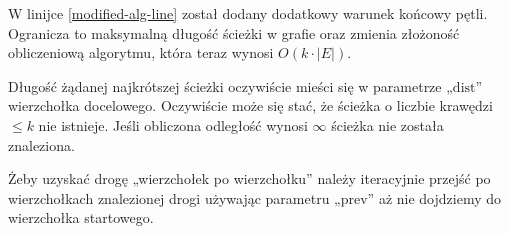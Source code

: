 \documentclass[14pt]{article}
\begin{document}
W linijce \ref{modified-alg-line} został dodany dodatkowy warunek końcowy pętli. Ogranicza to maksymalną długość ścieżki w grafie oraz zmienia złożoność obliczeniową algorytmu, która teraz wynosi $O(k\cdot |E|)$.

Długość żądanej najkrótszej ścieżki oczywiście mieści się w parametrze „$\mathrm{dist}$” wierzchołka docelowego. Oczywiście może się stać, że ścieżka o liczbie krawędzi $\le k$ nie istnieje. Jeśli obliczona odległość wynosi $\infty$ ścieżka nie została znaleziona.

Żeby uzyskać drogę „wierzchołek po wierzchołku” należy iteracyjnie przejść po wierzchołkach znalezionej drogi używając parametru „$\mathrm{prev}$” aż nie dojdziemy do wierzchołka startowego.
\end{document}
